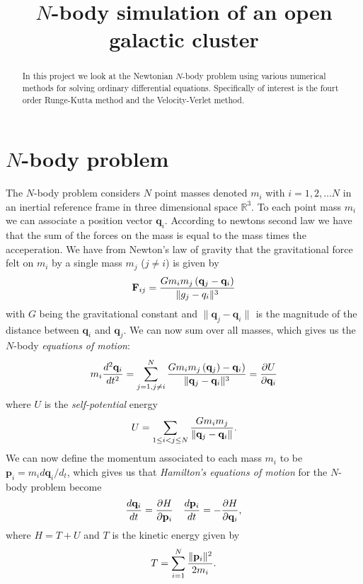 \documentclass[a4paper, 11pt]{article}
\title{$N$-body simulation of an open galactic cluster}
\begin{document}
\maketitle
\begin{abstract}
    In this project we look at the Newtonian $N$-body problem using various
    numerical methods for solving ordinary differential equations. Specifically
    of interest is the fourt order Runge-Kutta method and the Velocity-Verlet
    method.
\end{abstract}

\section{$N$-body problem}
\label{sec:_n_body_problem}

The $N$-body problem considers $N$ point masses denoted $m_i$ with $i = 1, 2,
\ldots N$ in an inertial reference frame in three dimensional space
$\mathbb{R}^3$. To each point mass $m_i$ we can associate a position vector
$\mathbf{q}_i$.  According to newtons second law we have that the sum of the
forces on the mass is equal to the mass times the acceperation. We have from
Newton's law of gravity that the gravitational force felt on $m_i$ by a single
mass $m_j$ ($j \neq i$) is given by
\begin{equation}
    \notag
    \mathbf{F}_{ij} = \frac{Gm_im_j \left( \mathbf{q}_j - \mathbf{q}_i \right)}{\|g_j - q_i\|_{}^3}
\end{equation}
with $G$ being the gravitational constant and $\|\mathbf{q}_j -
\mathbf{q}_i\|_{}$ is the magnitude of the distance between $\mathbf{q}_i$ and
$\mathbf{q}_j$.
We can now sum over all masses, which gives us the $N$-body \emph{equations of
motion}:
\begin{equation}
    \notag
    m_i \frac{d^2\mathbf{q}_i}{dt^2} = \sum^{N}_{j=1, j\neq i} \frac{Gm_im_j \left( \mathbf{q}_j \right) - \mathbf{q}_i)}{\|\mathbf{q}_j - \mathbf{q}_i\|_{}^3} = \frac{\partial U}{\partial \mathbf{q}_i}
\end{equation}
where $U$ is the \emph{self-potential} energy
\begin{equation}
    \notag
    U = \sum^{}_{1 \leq i < j \leq N} \frac{Gm_im_j}{\|\mathbf{q}_j-\mathbf{q}_i \|_{}}.
\end{equation}
We can now define the momentum associated to each mass $m_i$ to be $\mathbf{p}_i = m_id\mathbf{q}_i/d_t$, which gives us that \emph{Hamilton's equations of motion} for the $N$-body problem become
\begin{align*}
    \notag
    \frac{d\mathbf{q}_i}{dt} = \frac{\partial H}{\partial \mathbf{p}_i} && \frac{d\mathbf{p}_i}{dt} = -\frac{\partial H}{\partial \mathbf{q}_i},
\end{align*}
where $H = T + U$ and $T$ is the kinetic energy given by
\begin{equation}
    \notag
    T = \sum^{N}_{i=1} \frac{\|\mathbf{p}_i\|_{}^2}{2m_i}.
\end{equation}
\end{document}
